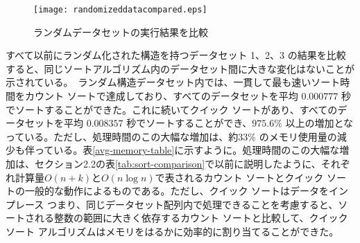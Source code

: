 \documentclass[a4j, 11pt]{jarticle}
\begin{document}
\begin{figure}[H]
  \centering
  \caption{ランダムデータセットの実行結果を比較}\label{combined-dataset-table-graph}
  \texttt{[image: randomizeddatacompared.eps]}
\end{figure}
すべて以前にランダム化された構造を持つデータセット 1、2、3 の結果を比較すると、同じソートアルゴリズム内のデータセット間に大きな変化はないことが示されている。\
ランダム構造データセット内では、一貫して最も速いソート時間をカウント ソートで達成しており、すべてのデータセットを平均 $0.000777$ 秒でソートすることができた。これに続いてクイック ソートがあり、すべてのデータセットを平均 $0.008357$ 秒でソートすることができ、$975.6\%$ 以上の増加となっている。ただし、処理時間のこの大幅な増加は、約$33\%$ のメモリ使用量の減少も伴っている。表\ref{avg-memory-table}に示すように。処理時間のこの大幅な増加は、セクション2.2の表\ref{tab:sort-comparison}で以前に説明したように、それぞれ計算量$O(n + k)$と$O(n \log n)$で表されるカウント ソートとクイック ソートの一般的な動作によるものである。ただし、クイック ソートはデータをインプレース \(つまり、同じデータセット配列内 \)で処理できることを考慮すると、ソートされる整数の範囲に大きく依存するカウント ソートと比較して、クイック ソート アルゴリズムはメモリをはるかに効率的に割り当てることができた。\
\begin{table}[H]
  \centering
  \caption{各データセットにおけるソート手法別のメモリ使用量（KB）および平均使用量（データ長：100000）}\label{avg-memory-table}
\end{table}
\end{document}
